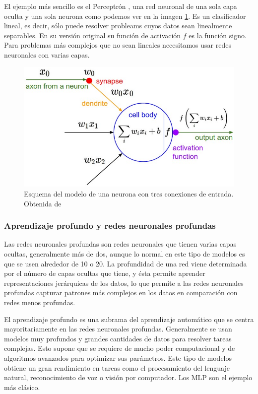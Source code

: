 El ejemplo más sencillo es el Perceptrón \cite{perceptron}, una red neuronal de una sola capa oculta y una sola neurona como podemos ver en la imagen \ref{fig:Perceptron}. Es un clasificador lineal, es decir, sólo puede resolver probleams cuyos datos sean linealmente separables. En su versión original su función de activación $f$ es la función signo. Para problemas más complejos que no sean lineales necesitamos usar redes neuronales con varias capas.


\begin{figure}
    \centering
    \includegraphics[width=0.75\linewidth]{Plantilla_TFG_latex//imagenes//Inf//2.Fund/neuron_model.jpeg}
    \caption{Esquema del modelo de una neurona con tres conexiones de entrada. Obtenida de \cite{stanford_231}}
    \label{fig:Perceptron}
\end{figure}


\subsubsection{Aprendizaje profundo y redes neuronales profundas}

Las redes neuronales profundas son redes neuronales que tienen varias capas ocultas, generalmente más de dos, aunque lo normal en este tipo de modelos es que se usen alrededor de 10 o 20. La profundidad de una red viene determinada por el número de capas ocultas que tiene, y ésta permite aprender representaciones jerárquicas de los datos, lo que permite a las redes neuronales profundas capturar patrones más complejos en los datos en comparación con redes menos profundas.

El aprendizaje profundo es una subrama del aprendizaje automático que se centra mayoritariamente en las redes neuronales profundas. Generalmente se usan modelos muy profundos y grandes cantidades de datos para resolver tareas complejas. Esto supone que se requiere de mucho poder computacional y de algoritmos avanzados para optimizar sus parámetros. Este tipo de modelos obtiene un gran rendimiento en tareas como el procesamiento del lenguaje natural, reconocimiento de voz o visión por computador. Los MLP son el ejemplo más clásico.





